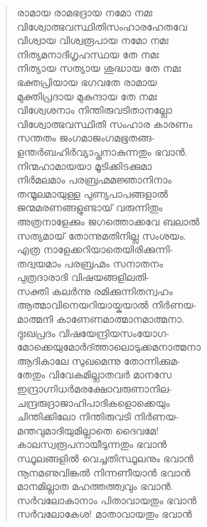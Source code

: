 \begin{verse}
രാമായ രാമഭദ്രായ നമോ നമഃ\\
വിശ്വോത്ഭവസ്ഥിതിസംഹാരഹേതവേ\\
വിശ്വായ വിശ്വരൂപായ നമോ നമഃ\\
നിത്യമനാദിഗൃഹസ്ഥയ തേ നമഃ\\
നിത്യായ സത്യായ ശുദ്ധായ തേ നമഃ\\
ഭക്തപ്രിയായ ഭഗവതേ രാമായ\\
മുക്തിപ്രദായ മുകുന്ദായ തേ നമഃ\\
വിശ്വേശനാം നിന്തിരുവടിതാനല്ലോ\\
വിശ്വോത്ഭവസ്ഥിതി സംഹാര കാരണം\\
സന്തതം ജംഗമാജംഗമഭൂതങ്ങ-\\
ളന്തര്‍ബഹിര്‍വ്യാപ്തനാകുന്നതും ഭവാന്‍.\\
നിന്മഹാമായയാ മൂടിക്കിടക്കുമാ\\
നിര്‍മലമാം പരബ്രഹ്മമജ്ഞാനിനാം\\
തന്മൂലമായുള്ള പുണ്യപാപങ്ങളാല്‍\\
ജന്മമരണങ്ങളുണ്ടായ് വരുന്നിതും\\
അത്രനാളേക്കും ജഗത്തൊക്കവേ ബലാല്‍\\
സത്യമായ് തോന്നുമതിനില്ല സംശയം.\\
എത്ര നാളേക്കറിയാതെയിരിക്കുന്നി-\\
തദ്വയമാം പരബ്രഹ്മം സനാതനം\\
പുത്രദാരാദി വിഷയങ്ങളിലതി-\\
സക്തി കലര്‍ന്നു രമിക്കുന്നിതന്വഹം\\
ആത്മാവിനെയറിയായ്കയാല്‍ നിര്‍ണയ-\\
മാത്മനി കാണേണമാത്മാനമാത്മനാ.\\
ദുഃഖപ്രദം വിഷയേന്ദ്രിയസംയോഗ-\\
മോക്കെയുമോര്‍ദ്ത്താലൊടുക്കമനാത്മനാ\\
ആദികാലേ സുഖമെന്നു തോന്നിക്കുമ-\\
തേതും വിവേകമില്ലാതവര്‍ മാനസേ\\
ഇന്ദ്രാഗ്നിധര്‍മരക്ഷോവരുണാനില-\\
ചന്ദ്രരുദ്രാജാഹിപാദികളൊക്കെയും\\
ചിന്തിക്കിലോ നിന്തിരുവടി നിര്‍ണയ-\\
മന്തവുമാദിയുമില്ലാതെ ദൈവമേ!\\
കാലസ്വരൂപനായീടുന്നതും ഭവാന്‍\\
സ്ഥൂലങ്ങളില്‍ വെച്ചതിസ്ഥൂലനും ഭവാന്‍\\
നൂനമണുവിങ്കല്‍ നിന്നണീയാന്‍ ഭവാന്‍\\
മാനമില്ലാത മഹത്തത്ത്വവും ഭവാന്‍.\\
സര്‍വലോകാനാം പിതാവായതും ഭവാന്‍\\
സര്‍വലോകേശ! മാതാവായതും ഭവാന്‍\\

\end{verse}
